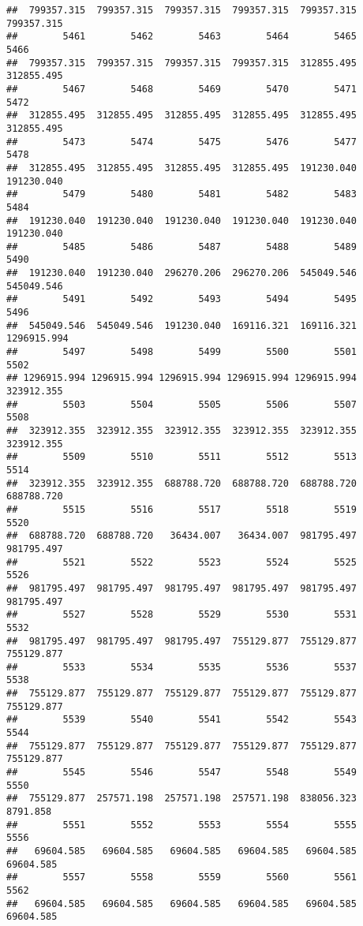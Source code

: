 \documentclass[
]{book}
\begin{document}
\begin{verbatim}
##  799357.315  799357.315  799357.315  799357.315  799357.315  799357.315 
##        5461        5462        5463        5464        5465        5466 
##  799357.315  799357.315  799357.315  799357.315  312855.495  312855.495 
##        5467        5468        5469        5470        5471        5472 
##  312855.495  312855.495  312855.495  312855.495  312855.495  312855.495 
##        5473        5474        5475        5476        5477        5478 
##  312855.495  312855.495  312855.495  312855.495  191230.040  191230.040 
##        5479        5480        5481        5482        5483        5484 
##  191230.040  191230.040  191230.040  191230.040  191230.040  191230.040 
##        5485        5486        5487        5488        5489        5490 
##  191230.040  191230.040  296270.206  296270.206  545049.546  545049.546 
##        5491        5492        5493        5494        5495        5496 
##  545049.546  545049.546  191230.040  169116.321  169116.321 1296915.994 
##        5497        5498        5499        5500        5501        5502 
## 1296915.994 1296915.994 1296915.994 1296915.994 1296915.994  323912.355 
##        5503        5504        5505        5506        5507        5508 
##  323912.355  323912.355  323912.355  323912.355  323912.355  323912.355 
##        5509        5510        5511        5512        5513        5514 
##  323912.355  323912.355  688788.720  688788.720  688788.720  688788.720 
##        5515        5516        5517        5518        5519        5520 
##  688788.720  688788.720   36434.007   36434.007  981795.497  981795.497 
##        5521        5522        5523        5524        5525        5526 
##  981795.497  981795.497  981795.497  981795.497  981795.497  981795.497 
##        5527        5528        5529        5530        5531        5532 
##  981795.497  981795.497  981795.497  755129.877  755129.877  755129.877 
##        5533        5534        5535        5536        5537        5538 
##  755129.877  755129.877  755129.877  755129.877  755129.877  755129.877 
##        5539        5540        5541        5542        5543        5544 
##  755129.877  755129.877  755129.877  755129.877  755129.877  755129.877 
##        5545        5546        5547        5548        5549        5550 
##  755129.877  257571.198  257571.198  257571.198  838056.323    8791.858 
##        5551        5552        5553        5554        5555        5556 
##   69604.585   69604.585   69604.585   69604.585   69604.585   69604.585 
##        5557        5558        5559        5560        5561        5562 
##   69604.585   69604.585   69604.585   69604.585   69604.585   69604.585 

\end{verbatim}
\end{document}
